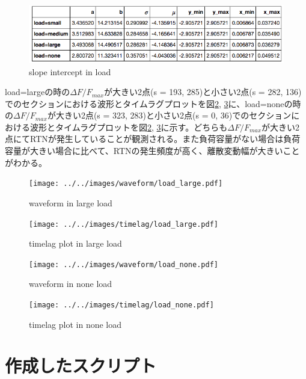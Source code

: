 \documentclass{jsarticle}
\begin{document}
\begin{figure}[hbtp]
	\centering
	\includegraphics[width=13cm]{../../least_squares/load.png}
	\caption{slope intercept in load}
	\label{fig:slope_intercept_in_load}
\end{figure}

load=largeの時の$\Delta F / F_{max}$が大きい2点(s = 193, 285)と小さい2点(s = 282, 136)でのセクションにおける波形とタイムラグプロットを図\ref{fig:waveform_in_load_large}, \ref{fig:timelag_in_load_large}に、load=noneの時の$\Delta F / F_{max}$が大きい2点(s = 323, 283)と小さい2点(s = 0, 36)でのセクションにおける波形とタイムラグプロットを図\ref{fig:waveform_in_load_large}, \ref{fig:timelag_in_load_large}に示す。どちらも$\Delta F / F_{max}$が大きい2点にてRTNが発生していることが観測される。また負荷容量がない場合は負荷容量が大きい場合に比べて、RTNの発生頻度が高く、離散変動幅が大きいことがわかる。

\begin{figure}[hbtp]
	\centering
	\texttt{[image: ../../images/waveform/load\_large.pdf]}
	\caption{waveform in large load}
	\label{fig:waveform_in_load_large}
\end{figure}

\begin{figure}[hbtp]
	\centering
	\texttt{[image: ../../images/timelag/load\_large.pdf]}
	\caption{timelag plot in large load}
	\label{fig:timelag_in_load_large}
\end{figure}

\begin{figure}[hbtp]
	\centering
	\texttt{[image: ../../images/waveform/load\_none.pdf]}
	\caption{waveform in none load}
	\label{fig:waveform_in_load_none}
\end{figure}

\begin{figure}[hbtp]
	\centering
	\texttt{[image: ../../images/timelag/load\_none.pdf]}
	\caption{timelag plot in none load}
	\label{fig:timelag_in_load_none}
\end{figure}

\section{作成したスクリプト}
\end{document}
